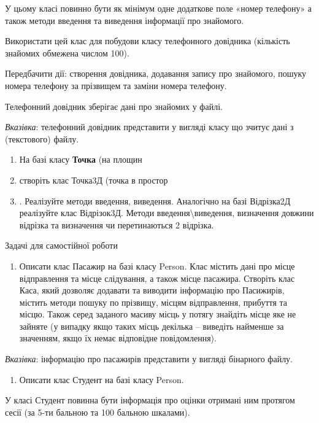 \documentclass[]{article}
\makeatletter
\newcommand{\xslalph}[1]{\expandafter\@xslalph\csname c@#1\endcsname}
\newcommand{\@xslalph}[1]{%
    \ifcase#1\or а\or б\or в\or г\or д\or e\or є\or ж\or з\or i%
    \or й\or к\or л\or м\or н\or о\or п\or р\or с\or т%
    \or у\or ф\or х\or ц\or ч\or ш\or ю\or я\or аа\or бб\or вв%
    \else\@ctrerr\fi%
}
\makeatother
\begin{document}
\begin{enumerate}
\begin{enumerate}[label=\xslalph*)]
\begin{enumerate}
\begin{enumerate}[label=\xslalph*)]
\begin{enumerate}
\begin{enumerate}[label=\xslalph*)]
\begin{enumerate}
\begin{enumerate}[label=\xslalph*)]
У цьому класі повинно бути як мінімум одне додаткове поле «номер
телефону» а також методи введення та виведення інформації про знайомого.

Використати цей клас для побудови класу телефонного довідника (кількість
знайомих обмежена числом 100).

Передбачити дії: створення довідника, додавання запису про знайомого,
пошуку номера телефону за прізвищем та заміни номера телефону.

Телефонний довідник зберігає дані про знайомих у файлі.

\emph{\emph{Вказівка}}: телефонний довідник представити у вигляді класу
що зчитує дані з (текстового) файлу.

\begin{enumerate}
\def\labelenumi{\arabic{enumi})}
\item
  На базі класу \textbf{Точка} (на площин\item створіть клас Точка3Д (точка
  в простор\item. Реалізуйте методи введення, виведення. Аналогічно на базі
  Відрізка2Д реалізуйте клас Відрізок3Д. Методи
  введення\textbackslash{}виведення, визначення довжини відрізка та
  визначення чи перетинаються 2 відрізка.
\end{enumerate}

Задачі для самостійної роботи

\begin{enumerate}
\def\labelenumi{\arabic{enumi})}
\item
  Описати клас Пасажир на базі класу Person. Клас містить дані про місце
  відправлення та місце слідування, а також місце пасажира. Створіть
  клас Каса, який дозволяє додавати та виводити інформацію про
  Пасижирів, містить методи пошуку по прізвищу, місцям відправлення,
  прибуття та місцю. Також серед заданого масиву місць у потягу знайдіть
  місце яке не зайняте (у випадку якщо таких місць декілька -- виведіть
  найменше за значенням, якщо їх немає відповідне повідомлення).
\end{enumerate}

\emph{\emph{Вказівка}}: інформацію про пасажирів представити у вигляді
бінарного файлу.

\begin{enumerate}
\def\labelenumi{\arabic{enumi})}
\item
  Описати клас Студент на базі класу Person.
\end{enumerate}

У класі Студент повинна бути інформація про оцінки отримані ним протягом
сесії (за 5-ти бальною та 100 бальною шкалами).


\end{enumerate}
\end{enumerate}
\end{enumerate}
\end{enumerate}
\end{enumerate}
\end{enumerate}
\end{enumerate}
\end{enumerate}
\end{document}
